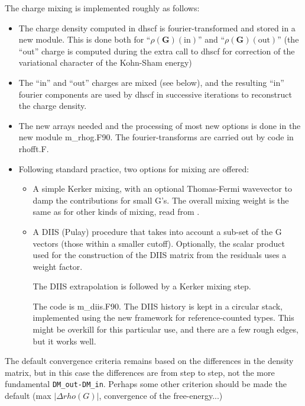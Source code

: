 The charge mixing is implemented roughly as follows:
\begin{itemize}
  \item The charge density computed in dhscf is fourier-transformed
  and stored in a new module. This is done both for
  ``$\rho(\mathbf{G})(\mathrm{in})$'' and
  ``$\rho(\mathbf{G})(\mathrm{out})$'' (the ``out'' charge is computed
  during the extra call to dhscf for correction of the variational
  character of the Kohn-Sham energy)

  \item The ``in'' and ``out''
  charges are mixed (see below), and the resulting ``in'' fourier
  components are used by dhscf in successive iterations to reconstruct
  the charge density.

  \item The new arrays needed and the processing
  of most new options is done in the new module m\_rhog.F90. The
  fourier-transforms are carried out by code in rhofft.F.  

  \item
  Following standard practice, two options for mixing are offered:
  \begin{itemize}
    \item A simple Kerker mixing, with an optional Thomas-Fermi wavevector to 
    damp the contributions for small G's. The overall mixing weight is
    the same as for other kinds of mixing, read from .
    
    \item A DIIS (Pulay) procedure that takes into account a sub-set of
    the G vectors (those within a smaller cutoff). Optionally, the
    scalar product used for the construction of the DIIS matrix from
    the residuals uses a weight factor. 
    
    The DIIS extrapolation is followed by a  Kerker mixing step.
    
    The code is m\_diis.F90. The DIIS history is kept in a circular
    stack, implemented using the new framework for reference-counted
    types. This might be overkill for this particular use, and there
    are a few rough edges, but it works well.

  \end{itemize}

\end{itemize}

The default convergence criteria remains based on the differences in
the density matrix, but in this case the differences are from step to
step, not the more fundamental \texttt{DM\_out-DM\_in}. Perhaps some
other criterion should be made the default (max $|\Delta rho(G)|$,
convergence of the free-energy...)

